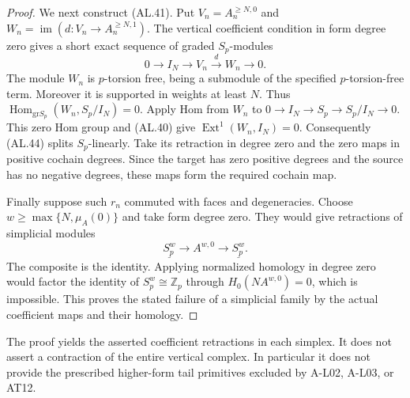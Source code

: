 \begin{proof}
We next construct \textup{(AL.41)}.  Put
$V_n=A_n^{\geq N,0}$ and
$W_n=\operatorname{im}(d:V_n\to A_n^{\geq N,1})$.
The vertical coefficient condition in form degree zero
gives a short exact sequence of graded $S_p$-modules
\[
 0\longrightarrow I_N\longrightarrow V_n
       \xrightarrow{\ d\ }W_n\longrightarrow0.
 \tag{AL.44}
\]
The module $W_n$ is $p$-torsion free, being a submodule
of the specified $p$-torsion-free term.  Moreover it
is supported in weights at least $N$.  Thus
$\operatorname{Hom}_{\mathrm{gr}S_p}(W_n,S_p/I_N)=0$.
Apply Hom from $W_n$ to
$0\to I_N\to S_p\to S_p/I_N\to0$.
This zero Hom group and \textup{(AL.40)} give
$\operatorname{Ext}^1(W_n,I_N)=0$.
Consequently \textup{(AL.44)} splits $S_p$-linearly.
Take its retraction in degree zero and the zero maps
in positive cochain degrees.  Since the target has
zero positive degrees and the source has no negative
degrees, these maps form the required cochain map.

Finally suppose such $r_n$ commuted with faces and
degeneracies.  Choose
$w\geq\max\{N,\mu_A(0)\}$ and take form degree zero.
They would give retractions of simplicial modules
\[
 \underline{S_p^w}\longrightarrow A^{w,0}
             \longrightarrow\underline{S_p^w}.
\]
The composite is the identity.  Applying normalized
homology in degree zero would factor the identity of
$S_p^w\cong\mathbb Z_p$ through
$H_0(N A^{w,0})=0$, which is impossible.
This proves the stated failure of a simplicial family
by the actual coefficient maps and their homology.
\end{proof}

The proof yields the asserted coefficient retractions
in each simplex.  It does not assert a contraction of
the entire vertical complex.  In particular it does not
provide the prescribed higher-form tail primitives
excluded by A-L02, A-L03, or AT12.
